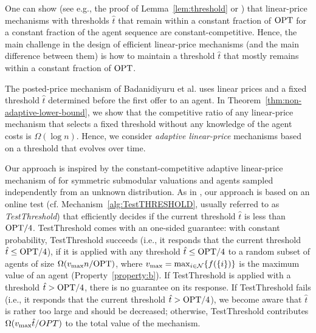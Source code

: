 One can show (see e.g., the proof of Lemma~\ref{lem:threshold} or \cite[Lemma~4.4]{Bada2012}) that linear-price mechanisms with thresholds $\hat{t}$ that remain within a constant fraction of $\mathrm{OPT}$ for a constant fraction of the agent sequence are constant-competitive. Hence, the main challenge in the design of efficient linear-price mechanisms (and the main difference between them) is how to maintain a threshold $\hat{t}$ that mostly remains within a constant fraction of $\mathrm{OPT}$. 

The posted-price mechanism of Badanidiyuru et al. \cite[Section~4]{Bada2012} uses linear prices and a fixed threshold $\hat{t}$ determined before the first offer to an agent. In Theorem~\ref{thm:non-adaptive-lower-bound}, we show that the competitive ratio of any linear-price mechanism that selects a fixed threshold without any knowledge of the agent costs is $\Omega(\log n)$. Hence, we consider \emph{adaptive linear-price} mechanisms based on a threshold that evolves over time. 

Our approach is inspired by the constant-competitive adaptive linear-price mechanism of \cite[Section~3]{Bada2012} for symmetric submodular valuations and agents sampled independently from an unknown distribution.
%
As in \cite[Section~3]{Bada2012}, our approach is based on an online test (cf. Mechanism~\ref{alg:TestTHRESHOLD}, usually referred to as \emph{TestThreshold}) that efficiently decides if the current threshold $\hat{t}$ is less than $\mathrm{OPT} / 4$. TestThreshold comes with an one-sided guarantee: with constant probability, TestThreshold succeeds (i.e., it responds that the current threshold $\hat{t} \leq \mathrm{OPT}/4$), if it is applied with any threshold $\hat{t} \leq \mathrm{OPT} / 4$ to a random subset of agents of size $\Omega( v_{\text{max}} n / \mathrm{OPT})$, where $v_{\text{max}} = \max_{i \in \mathcal{N}} \{ f(\{i\}) \}$ is the maximum value of an agent (Property~\ref{property:b}). If TestThreshold is applied with a threshold $\hat{t} > \mathrm{OPT} / 4$, there is no guarantee on its response. If TestThreshold fails (i.e., it responds that the current threshold $\hat{t} > \mathrm{OPT} / 4$), we become aware that $\hat{t}$ is rather too large and should be decreased; otherwise, TestThreshold contributes $\Omega(v_{\text{max}} \hat{t} / OPT)$ to the total value of the mechanism.  

